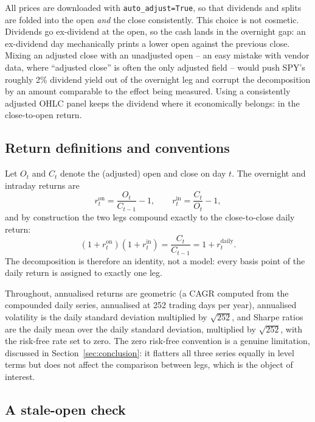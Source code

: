 \documentclass[11pt]{article}
\begin{document}
All prices are downloaded with \texttt{auto\_adjust=True}, so that dividends and splits are folded into the open \emph{and} the close consistently. This choice is not cosmetic. Dividends go ex-dividend at the open, so the cash lands in the overnight gap: an ex-dividend day mechanically prints a lower open against the previous close. Mixing an adjusted close with an unadjusted open -- an easy mistake with vendor data, where ``adjusted close'' is often the only adjusted field -- would push SPY's roughly 2\% dividend yield out of the overnight leg and corrupt the decomposition by an amount comparable to the effect being measured. Using a consistently adjusted OHLC panel keeps the dividend where it economically belongs: in the close-to-open return.

\subsection{Return definitions and conventions}

Let $O_t$ and $C_t$ denote the (adjusted) open and close on day $t$. The overnight and intraday returns are
\begin{equation}
r^{\text{on}}_t = \frac{O_t}{C_{t-1}} - 1,
\qquad
r^{\text{in}}_t = \frac{C_t}{O_t} - 1,
\end{equation}
and by construction the two legs compound exactly to the close-to-close daily return:
\begin{equation}
(1 + r^{\text{on}}_t)(1 + r^{\text{in}}_t) = \frac{C_t}{C_{t-1}} = 1 + r^{\text{daily}}_t.
\end{equation}
The decomposition is therefore an identity, not a model: every basis point of the daily return is assigned to exactly one leg.

Throughout, annualised returns are geometric (a CAGR computed from the compounded daily series, annualised at 252 trading days per year), annualised volatility is the daily standard deviation multiplied by $\sqrt{252}$, and Sharpe ratios are the daily mean over the daily standard deviation, multiplied by $\sqrt{252}$, with the risk-free rate set to zero. The zero risk-free convention is a genuine limitation, discussed in Section~\ref{sec:conclusion}: it flatters all three series equally in level terms but does not affect the comparison between legs, which is the object of interest.

\subsection{A stale-open check}
\label{sec:stale}
\end{document}
